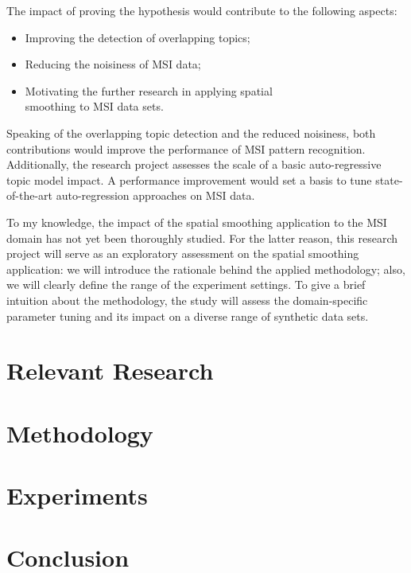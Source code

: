 \documentclass{mpaper}
\begin{document}
\par The impact of proving the hypothesis would contribute to the following aspects:
\begin{itemize}
	\item Improving the detection of overlapping topics;
	\item Reducing the noisiness of MSI data;
	\item Motivating the further research in applying spatial \\smoothing to MSI data sets.
\end{itemize} 
Speaking of the overlapping topic detection and the reduced noisiness, both contributions would improve the performance of MSI pattern recognition. Additionally, the research project assesses the scale of a basic auto-regressive topic model impact. A performance improvement would set a basis to tune state-of-the-art auto-regression approaches on MSI data.

\par To my knowledge, the impact of the spatial smoothing application to the MSI domain has not yet been thoroughly studied. For the latter reason, this research project will serve as an exploratory assessment on the spatial smoothing application: we will introduce the rationale behind the applied methodology; also, we will clearly define the range of the experiment settings. To give a brief intuition about the methodology, the study will assess the domain-specific parameter tuning and its impact on a diverse range of synthetic data sets.

\section{Relevant Research}

\lipsum[1-3]

\section{Methodology}

\lipsum[1-3]

 \section{Experiments}

\lipsum[1-3]

\section{Conclusion}

\lipsum[1]



\end{document}
